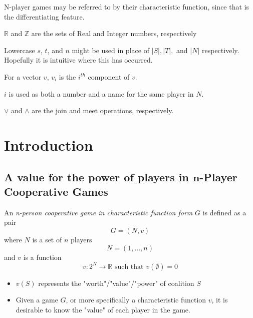 \documentclass[
paper=128mm:96mm, %
fontsize=11pt, %
pagesize, %
parskip=half-, %
]{scrartcl} %
\theoremstyle{mythmstyle} %
\begin{document}
N-player games may be referred to by their characteristic function, since that is the differentiating feature.

$\mathbb{R}$ and $\mathbb{Z}$ are the sets of Real and Integer numbers, respectively

Lowercase $s$, $t$, and $n$ might be used in place of $|S|, |T|,$ and $|N|$ respectively. Hopefully it is intuitive where this has occurred.

For a vector $v$, $v_{i}$ is the $i^{th}$ component of $v$.

$i$ is used as both a number and a name for the same player in $N$.

$\vee$ and $\wedge$ are the join and meet operations, respectively.

\clearpage


\section{Introduction}
\clearpage

\subsection{A value for the power of players in $\mathbf{n}$-Player Cooperative Games}

An \textit{n-person cooperative game in characteristic function form} $G$ is defined as a pair
\[ G = (N, v)\]
where $N$ is a set of $n$ players
\[ N = (1, \dots, n) \]
and $v$ is a function
\[ v: 2^{N} \rightarrow \mathbb{R} \text{ such that } v(\emptyset) = 0 \]

\clearpage

\begin{itemize}
\item $v(S)$ represents the "worth"/"value"/"power" of coalition $S$
\item Given a game $G$, or more specifically a characteristic function $v$, it is desirable to know the "value" of each player in the game.
\end{itemize}

\clearpage
\end{document}
